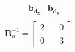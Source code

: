 \documentclass[preview]{standalone}
\begin{document}
\begin{align*}
\begin{array}{c}\begin{matrix}\hspace{1cm} \mathbf{b_{d_x}} & \mathbf{b_{d_y}}  \end{matrix} \\  \mathbf{B}^{-1}_n = \begin{bmatrix} 2 & \quad 0 \\ \\0 & \quad 3 \end{bmatrix} \end{array}
\end{align*}
\end{document}
